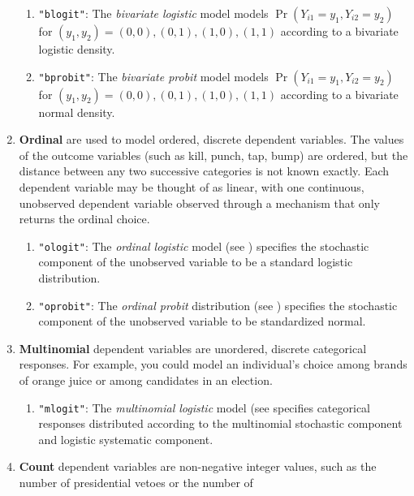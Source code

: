 \begin{enumerate}
\begin{enumerate}
   \item {\tt "blogit"}: The {\it bivariate logistic} model models $\Pr(Y_{i1} = y_1, Y_{i2} = y_2)$ for
$(y_1, y_2) = {(0,0), (0,1), (1,0), (1,1)}$ according 
to a bivariate logistic density.
   \item {\tt "bprobit"}: The {\it bivariate probit} model
      models $\Pr(Y_{i1} = y_1, Y_{i2} = y_2)$ for
$(y_1, y_2) = {(0,0), (0,1), (1,0), (1,1)}$ according to a bivariate normal density.  
\end{enumerate} 
 \item {\bf  Ordinal} are used to model
   ordered, discrete dependent variables.  The values of the outcome
   variables (such as kill, punch, tap, bump) are ordered, but the
   distance between any two successive categories is not known
   exactly.  Each dependent variable may be thought of as linear, with
one continuous, unobserved dependent variable observed through a mechanism
   that only returns the ordinal choice.
   \begin{enumerate}
   \item {\tt "ologit"}: The {\it ordinal logistic} model (see
     ) specifies the stochastic component of the
     unobserved variable to be a standard logistic distribution.
   \item {\tt "oprobit"}: The {\it ordinal probit} distribution (see
     ) specifies the stochastic component of the
     unobserved variable to be standardized normal.
   \end{enumerate}
 \item {\bf Multinomial} dependent variables are unordered, discrete
   categorical responses.  For example, you could model an
   individual's choice among brands of orange juice or among
   candidates in an election.
    \begin{enumerate}
    \item {\tt "mlogit"}: The {\it multinomial logistic} model (see
      specifies categorical responses distributed
      according to the multinomial stochastic component and logistic
      systematic component.
    \end{enumerate}
  \item {\bf Count} dependent variables are non-negative integer
values, such as the number of presidential vetoes or the number of

\end{enumerate}
